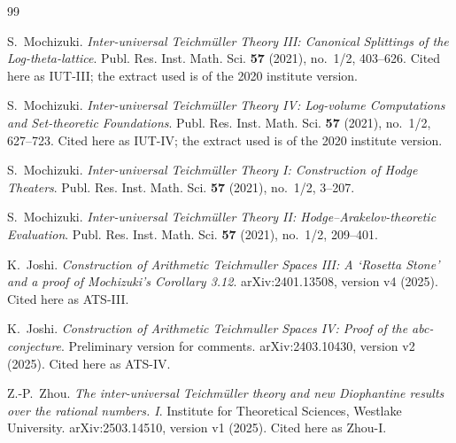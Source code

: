 \documentclass[11pt,a4paper]{article}
\theoremstyle{definition}
\begin{document}
\begin{thebibliography}{99}
\small

S.~Mochizuki.
\newblock \emph{Inter-universal Teichmüller Theory III: Canonical Splittings of
the Log-theta-lattice}.
\newblock Publ. Res. Inst. Math. Sci. \textbf{57} (2021), no.~1/2, 403--626.
\newblock Cited here as IUT-III; the extract used is of the 2020 institute
version.

S.~Mochizuki.
\newblock \emph{Inter-universal Teichmüller Theory IV: Log-volume Computations
and Set-theoretic Foundations}.
\newblock Publ. Res. Inst. Math. Sci. \textbf{57} (2021), no.~1/2, 627--723.
\newblock Cited here as IUT-IV; the extract used is of the 2020 institute version.

S.~Mochizuki.
\newblock \emph{Inter-universal Teichmüller Theory I: Construction of Hodge
Theaters}.
\newblock Publ. Res. Inst. Math. Sci. \textbf{57} (2021), no.~1/2, 3--207.

S.~Mochizuki.
\newblock \emph{Inter-universal Teichmüller Theory II:
Hodge--Arakelov-theoretic Evaluation}.
\newblock Publ. Res. Inst. Math. Sci. \textbf{57} (2021), no.~1/2, 209--401.

K.~Joshi.
\newblock \emph{Construction of Arithmetic Teichmuller Spaces III: A `Rosetta
Stone' and a proof of Mochizuki's Corollary 3.12}.
\newblock arXiv:2401.13508, version v4 (2025). Cited here as ATS-III.

K.~Joshi.
\newblock \emph{Construction of Arithmetic Teichmuller Spaces IV: Proof of the
abc-conjecture}. Preliminary version for comments.
\newblock arXiv:2403.10430, version v2 (2025). Cited here as ATS-IV.

Z.-P.~Zhou.
\newblock \emph{The inter-universal Teichmüller theory and new Diophantine
results over the rational numbers. I}.
\newblock Institute for Theoretical Sciences, Westlake University.
\newblock arXiv:2503.14510, version v1 (2025). Cited here as Zhou-I.


\end{thebibliography}
\end{document}
